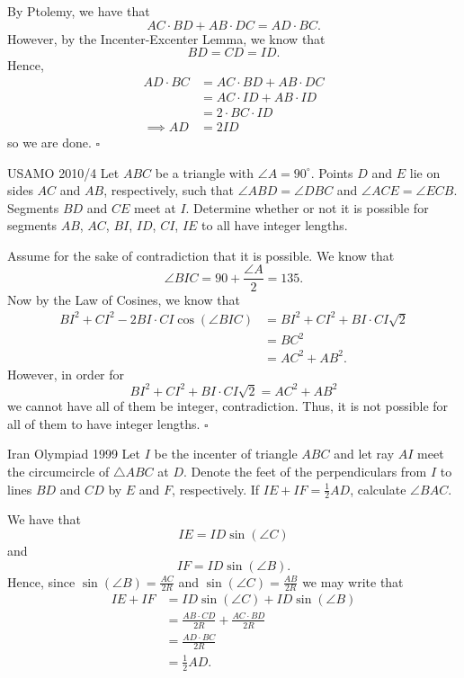 \documentclass{article}
\begin{document}
By Ptolemy, we have that \[AC\cdot BD + AB\cdot DC = AD\cdot BC.\] However, by the Incenter-Excenter Lemma, we know that \[BD = CD = ID.\] Hence,
\begin{align*}
AD\cdot BC &= AC\cdot BD + AB\cdot DC \\
&= AC\cdot ID + AB\cdot ID \\
&= 2\cdot BC\cdot ID \\
\implies AD &= 2ID
\end{align*}
so we are done. $\square$

\begin{problem}[5.21]{USAMO 2010/4}
Let $ABC$ be a triangle with $\angle A = 90^\circ$. Points $D$ and $E$ lie on sides $AC$ and $AB$, respectively, such that $\angle ABD = \angle DBC$ and $\angle ACE = \angle ECB$. Segments $BD$ and $CE$ meet at $I$. Determine whether or not it is possible for segments $AB$, $AC$, $BI$, $ID$, $CI$, $IE$ to all have integer lengths.
\end{problem}

Assume for the sake of contradiction that it is possible. We know that \[\angle BIC = 90+\dfrac{\angle A}{2} = 135.\] Now by the Law of Cosines, we know that 
\begin{align*}
BI^2+CI^2-2BI\cdot CI\cos(\angle BIC) &= BI^2+CI^2+BI\cdot CI\sqrt{2} \\
&= BC^2 \\
&= AC^2+AB^2.
\end{align*}
However, in order for \[BI^2+CI^2+BI\cdot CI\sqrt{2}= AC^2+AB^2\] we cannot have all of them be integer, contradiction. Thus, it is not possible for all of them to have integer lengths. $\square$

\begin{problem}[5.22]{Iran Olympiad 1999}
Let $I$ be the incenter of triangle $ABC$ and let ray $AI$ meet the circumcircle of $\triangle ABC$ at $D$. Denote the feet of the perpendiculars from $I$ to lines $BD$ and $CD$ by $E$ and $F$, respectively. If $IE + IF = \tfrac{1}{2}AD$, calculate $\angle BAC$.
\end{problem}

We have that \[IE = ID\sin(\angle C)\] and \[IF = ID\sin(\angle B).\] Hence, since $\sin(\angle B) = \tfrac{AC}{2R}$ and $\sin(\angle C) = \tfrac{AB}{2R}$ we may write that
\begin{align*}
IE+IF &= ID\sin(\angle C)+ID\sin(\angle B) \\
&= \frac{AB\cdot CD}{2R}+\frac{AC\cdot BD}{2R} \\
&= \frac{AD\cdot BC}{2R} \\
&= \tfrac{1}{2}AD.
\end{align*}
\end{document}
